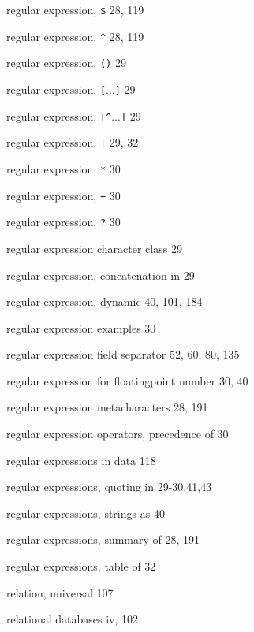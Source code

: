 \begin{multicols}{3}
\hangindent=3pc  regular expression, \verb'$' 28, 119

\hangindent=3pc  regular expression, \verb'^' 28, 119

\hangindent=3pc  regular expression, \verb'()' 29

\hangindent=3pc  regular expression, \verb'['...\verb']' 29

\hangindent=3pc  regular expression, \verb'[^'...\verb']' 29

\hangindent=3pc  regular expression, \verb'|' 29, 32

\hangindent=3pc  regular expression, \verb'*' 30

\hangindent=3pc  regular expression, \verb'+' 30

\hangindent=3pc  regular expression, \verb'?' 30

\hangindent=3pc  regular expression character class 29

\hangindent=3pc  regular expression, concatenation in 29

\hangindent=3pc  regular expression, dynamic 40, 101, 184

\hangindent=3pc  regular expression examples 30

\hangindent=3pc  regular expression field separator 52, 60, 80, 135

\hangindent=3pc  regular expression for floatingpoint number 30, 40



\hangindent=3pc  regular expression metacharacters 28, 191

\hangindent=3pc  regular expression operators, precedence of 30

\hangindent=3pc  regular expressions in data 118

\hangindent=3pc  regular expressions, quoting in 29-30,41,43

\hangindent=3pc  regular expressions, strings as 40

\hangindent=3pc  regular expressions, summary of 28, 191

\hangindent=3pc  regular expressions, table of 32

\hangindent=3pc  relation, universal 107

\hangindent=3pc  relational databases iv, 102


\end{multicols}
